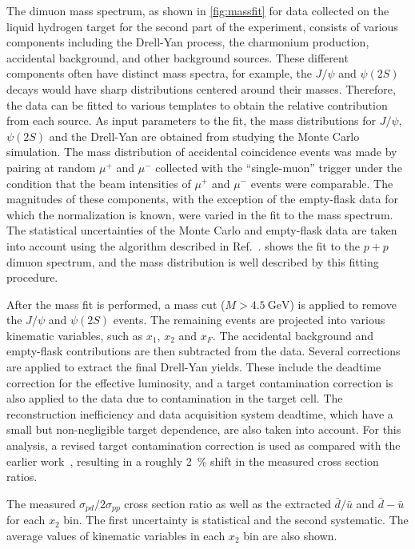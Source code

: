 \documentclass[reprint,aps,unsortedaddress,superscriptaddress,prl,floatfix,showpacs,linenumbers]{revtex4-2}
\begin{document}
The dimuon mass spectrum, as shown in \cref{fig:massfit} for data collected
on the liquid hydrogen target for the second part of the experiment, consists
of various components including the Drell-Yan process, the charmonium
production, accidental background, and other background sources.
These different components often have distinct mass spectra, for example, the $J/\psi$
and $\psi\left(2S\right)$ decays would have sharp distributions centered around their masses.
Therefore, the data can be fitted to various templates to obtain
the relative contribution from each source.
As input parameters to the fit, the mass distributions for $J/\psi$, $\psi\left(2S\right)$
and the Drell-Yan are obtained from studying the Monte Carlo simulation. %
The mass distribution of accidental coincidence events was made by pairing at random $\mu^+$ and $\mu^-$ collected with the ``single-muon'' trigger
under the condition that the beam intensities of $\mu^+$ and $\mu^-$ events were comparable.
The magnitudes of these components,
with the exception of the empty-flask data for which the normalization is known,
were varied in the fit to the mass spectrum.
The statistical uncertainties of the Monte Carlo and empty-flask data are taken into account using the algorithm described in Ref.~\cite{barlow1993}.
 shows the fit to the $p+p$ dimuon spectrum,
and the mass distribution is well described by this fitting procedure.

After the mass fit is performed,
a mass cut ($M>\SI{4.5}{\GeV}$) is applied to remove the $J/\psi$ and $\psi\left(2S\right)$ events.
The remaining events are projected into various kinematic variables, such as $x_1$, $x_2$ and $x_F$. %
The accidental background and empty-flask contributions are then subtracted from the data.
Several corrections are applied to extract the final Drell-Yan yields.
These include the deadtime correction for the effective luminosity,
and a target contamination correction is also applied to the  data due to  contamination in the target cell.
The reconstruction inefficiency and data acquisition system deadtime, which have a small but non-negligible target dependence,
are also taken into account.
For this analysis,
a revised target contamination correction is used as compared with the earlier work~\cite{dove2021,dove2023},
resulting in a roughly \SI{2}{\percent} shift in the measured cross section ratios.

\begin{table}[htbp!]
	\centering
	\caption{The measured $\sigma_{pd}/2\sigma_{pp}$ cross section ratio as well
		as the extracted $\bar{d}/\bar{u}$ and $\bar{d}-\bar{u}$ for each $x_{2}$ bin.
		The first uncertainty is statistical and the second systematic.
		The average values of kinematic variables in each $x_2$ bin are also shown.}
	\label{tab:dbarubar}
	\begin{adjustbox}{max width=\textwidth}
		
	\end{adjustbox}
\end{table}
\end{document}
